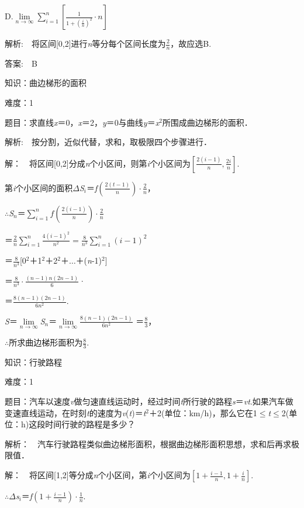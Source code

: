 \documentclass{article} %
\begin{document}
D.$\lim\limits_{n\rightarrow \infty}\sum\limits_{i=1}^n[\frac{1}{1+(\frac{i}{n})^2}\cdot n]$

 解析:　将区间[0,2]进行\textit{n}等分每个区间长度为$\frac{2}{n}$，故应选B.

 答案:　B



 知识：曲边梯形的面积

 难度：1

 题目：求直线\textit{x}＝0，\textit{x}＝2，\textit{y}＝0与曲线\textit{y}＝\textit{x}${}^{2}$所围成曲边梯形的面积．

 解析:　按分割，近似代替，求和，取极限四个步骤进行．

 解：　将区间[0,2]分成\textit{n}个小区间，则第\textit{i}个小区间为$[\frac{2(i-1)}{n}, \frac{2i}{n}]$.

第\textit{i}个小区间的面积$\Delta$\textit{S${}_{i}$}＝\textit{f}$(\frac{2(t-1)}{n})\cdot\frac{2}{n}$，

$\mathrm{\therefore}$\textit{S${}_{n}$}＝$\sum\limits_{i=1}^nf(\frac{2(i-1)}{n})\cdot\frac{2}{n}$

＝$\frac{2}{n}\sum\limits_{i=1}^n\frac{4(i-1)^2}{n^2}=\frac{8}{n^3}\sum\limits_{i=1}^n(i-1)^2$

＝$\frac{8}{n^3}$[0${}^{2}$＋1${}^{2}$＋2${}^{2}$＋{$\dots$}＋(\textit{n}-1)${}^{2}$]

＝$\frac{8}{n^3}\cdot\frac{(n-1)n(2n-1)}{6}$·

＝$\frac{8(n-1)(2n-1)}{6n^2}$.

\textit{S}＝$\lim\limits_{n\rightarrow \infty}$\textit{S${}_{n}$}＝$\lim\limits_{n\rightarrow \infty} \frac{8(n-1)(2n-1)}{6n^2}$ ＝$\frac{8}{3}$，

$\mathrm{\therefore}$所求曲边梯形面积为$\frac{8}{3}$.



 知识：行驶路程

 难度：1

 题目：汽车以速度\textit{v}做匀速直线运动时，经过时间\textit{t}所行驶的路程\textit{s}＝\textit{vt}.如果汽车做变速直线运动，在时刻\textit{t}的速度为\textit{v}(\textit{t})＝\textit{t}${}^{2}$＋2(单位：km/h)，那么它在1$\mathrm{\le}$\textit{t}$\mathrm{\le}$2(单位：h)这段时间行驶的路程是多少？

 解析：　汽车行驶路程类似曲边梯形面积，根据曲边梯形面积思想，求和后再求极限值．

 解：　将区间[1,2]等分成\textit{n}个小区间，第\textit{i}个小区间为$[1+\frac{i-1}{n}, 1+\frac{i}{n}]$.

$\mathrm{\therefore}$$\Delta$\textit{s${}_{i}$}＝\textit{f}$(1+\frac{i-1}{n})\cdot\frac{1}{n}$.
\end{document}
